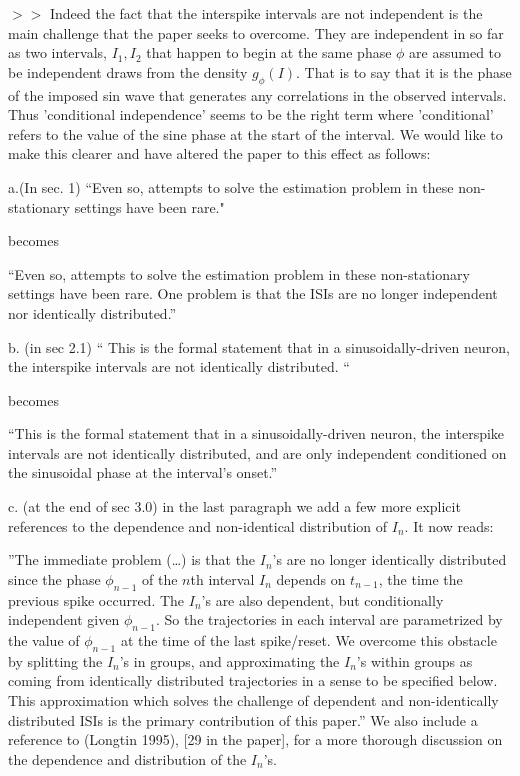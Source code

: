 \documentclass{article}
\begin{document}
$>>$ Indeed the fact that the interspike intervals are not independent is the
main challenge that the paper seeks to overcome. They are independent in so far
as two intervals, $I_1, I_2$ that happen to begin at the same phase $\phi$ are
assumed to be independent draws from the density $g_\phi(I)$. That is to say
that it is the phase of the imposed sin wave that generates any correlations in
the observed intervals. Thus 'conditional independence' seems to be the right
term where 'conditional' refers to the value of the sine phase at the start of
the interval. We would like to make this clearer and have altered the paper to
this effect as follows:

a.(In sec. 1) ``Even so, attempts to solve the estimation problem in
these non-stationary settings have been rare."

becomes

``Even so, attempts to solve the estimation problem in
these non-stationary settings have been rare. One problem is that the ISIs are
no longer independent nor identically distributed.''

b. (in sec 2.1)
`` This is the formal statement that
in a sinusoidally-driven neuron, the interspike intervals are not identically
distributed. ``

becomes

``This is the formal statement that
in a sinusoidally-driven neuron, the interspike intervals are not identically
distributed, and are only independent conditioned on the sinusoidal phase at the
interval's onset.''

c. (at the end of sec 3.0) in the last paragraph we add a few more explicit
references to the dependence and non-identical distribution of $I_n$. It now
reads:

''The immediate problem (\ldots) is that the $I_n$'s are no longer identically distributed since
the phase $\phi_{n-1}$ of the $n$th interval $I_n$ depends on $t_{n-1}$, the
time the previous spike occurred. The $I_n$'s are also dependent, but conditionally
independent given $\phi_{n-1}$. So the trajectories in each interval are
parametrized by the value of $\phi_{n-1}$ at the time of the last spike/reset.
We overcome this obstacle by splitting the $I_n$'s in groups, and
approximating the $I_n$'s within groups as coming from identically
distributed trajectories in a sense to be specified below. This approximation
which solves the challenge of dependent and non-identically distributed ISIs is
the primary contribution of this paper.''
We also include a reference to (Longtin 1995), [29 in the paper], for a more
thorough discussion on the dependence and distribution of the $I_n$'s.
\end{document}

